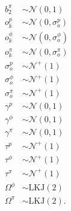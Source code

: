 \documentclass[12pt,letterpaper]{article}
\begin{document}
\begin{equation}
\begin{split}
    b^{\pi}_{2} &\sim \mathcal{N}(0, 1) \\
    o^{p}_{k} &\sim \mathcal{N}(0, \sigma^{p}_{o}) \\ 
    o^{\phi}_{k} &\sim \mathcal{N}(0, \sigma^{\phi}_{o}) \\ 
    o^{\pi}_{k} &\sim \mathcal{N}(0, \sigma^{\pi}_{o}) \\ 
    \sigma^{p}_{o} &\sim \mathcal{N^{+}}(1) \\
    \sigma^{\phi}_{o} &\sim \mathcal{N^{+}}(1) \\
    \sigma^{\pi}_{o} &\sim \mathcal{N^{+}}(1) \\
    \gamma^{p} &\sim \mathcal{N}(0, 1) \\
    \gamma^{\phi} &\sim \mathcal{N}(0, 1) \\
    \gamma^{\pi} &\sim \mathcal{N}(0, 1) \\
    \tau^{p} &\sim \mathcal{N}^{+}(1) \\
    \tau^{\phi} &\sim \mathcal{N}^{+}(1) \\
    \tau^{\pi} &\sim \mathcal{N}^{+}(1) \\
    \Omega^{\phi} &\sim \text{LKJ}(2) \\
    \Omega^{\pi} &\sim \text{LKJ}(2). \\
  \end{split}
  \label{eq:birth_death}
\end{equation}
\end{document}

